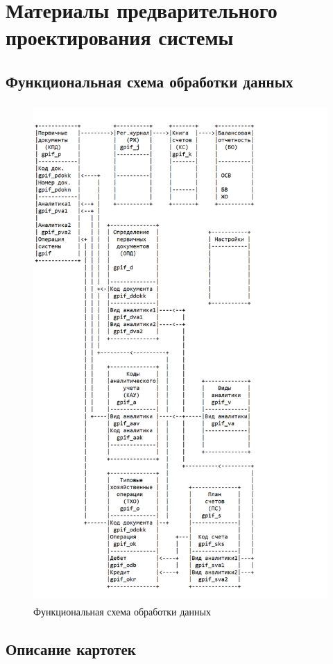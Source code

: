 \section{Материалы предварительного проектирования системы}
\subsection{Функциональная схема обработки данных}

\begin{figure}[!htb]
    \centering
    \includegraphics[height=19cm]
        {_assets/gpif_part2.png}
    \caption{Функциональная схема обработки данных}
    \label{fig:gpif_part2}
\end{figure}

\subsection{Описание картотек}

